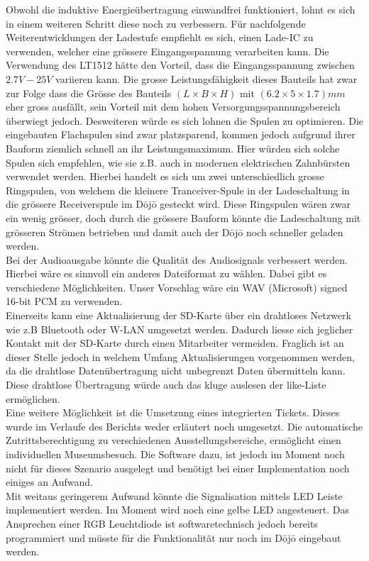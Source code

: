 Obwohl die induktive Energieübertragung einwandfrei funktioniert, lohnt es sich in einem weiteren Schritt diese noch zu verbessern. Für nachfolgende Weiterentwicklungen der Ladestufe empfiehlt es sich, einen Lade-IC zu verwenden, welcher eine grössere Eingangsspannung verarbeiten kann. Die Verwendung des LT1512 hätte den Vorteil, dass die Eingangsspannung zwischen $2.7V - 25V$ variieren kann. Die grosse Leistungsfähigkeit dieses Bauteils hat zwar zur Folge dass die Grösse des Bauteils $(L \times B \times H)$ mit $(6.2\times 5\times 1.7)mm$ eher gross ausfällt, sein Vorteil mit dem hohen Versorgungsspannungsbereich überwiegt jedoch. Desweiteren würde es sich lohnen die Spulen zu optimieren. Die eingebauten Flachspulen sind zwar platzsparend, kommen jedoch aufgrund ihrer Bauform ziemlich schnell an ihr Leistungsmaximum. Hier würden sich solche Spulen sich empfehlen, wie sie z.B. auch in modernen elektrischen Zahnbürsten verwendet werden. Hierbei handelt es sich um zwei unterschiedlich grosse Ringspulen, von welchem die kleinere Tranceiver-Spule in der Ladeschaltung in die grössere Receiverspule  im Dōjō gesteckt wird. Diese Ringspulen wären zwar ein wenig grösser, doch durch die grössere Bauform könnte die Ladeschaltung mit grösseren Strömen betrieben und damit auch der Dōjō noch schneller geladen werden.\\
Bei der Audioausgabe könnte die Qualität des Audiosignals verbessert werden. Hierbei wäre es sinnvoll ein anderes Dateiformat zu wählen. Dabei gibt es verschiedene Möglichkeiten. Unser Vorschlag wäre ein WAV (Microsoft) signed 16-bit PCM zu verwenden.\\
Einerseits kann eine Aktualisierung der SD-Karte über ein drahtloses Netzwerk wie z.B Bluetooth oder W-LAN umgesetzt werden. Dadurch liesse sich jeglicher Kontakt mit der SD-Karte durch einen Mitarbeiter vermeiden. Fraglich ist an dieser Stelle jedoch in welchem Umfang Aktualisierungen vorgenommen werden, da die drahtlose Datenübertragung nicht unbegrenzt Daten übermitteln kann. Diese drahtlose Übertragung würde auch das kluge auslesen der like-Liste ermöglichen.\\
Eine weitere Möglichkeit ist die Umsetzung eines integrierten Tickets. Dieses wurde im Verlaufe des Berichts weder erläutert noch umgesetzt. Die automatische Zutrittsberechtigung zu verschiedenen Ausstellungsbereiche, ermöglicht einen individuellen Museumsbesuch. Die Software dazu, ist jedoch im Moment noch nicht für dieses Szenario ausgelegt und benötigt bei einer Implementation noch einiges an Aufwand.\\
Mit weitaus geringerem Aufwand könnte die Signalisation mittels LED Leiste implementiert werden. Im Moment wird noch eine gelbe LED angesteuert. Das Ansprechen einer RGB Leuchtdiode ist softwaretechnisch jedoch bereits programmiert und müsste für die Funktionalität nur noch im Dōjō eingebaut werden.